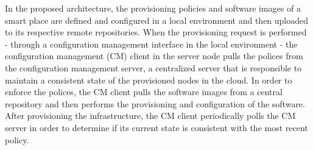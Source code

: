 In the proposed architecture, the provisioning policies and software images of a smart place are
defined and configured in a local environment and then uploaded to its respective remote repositories.
When the provisioning request is performed - through a configuration management interface in the local
environment - the configuration management (CM) client in the server node pulls the polices from the
configuration management server, a centralized server that is responsible to maintain a consistent
state of the provisioned nodes in the cloud. In order to enforce the polices, the CM client pulls the
software images from a central repository and then performs the provisioning and configuration of
the software. After provisioning the infrastructure, the CM client periodically polls the CM server
in order to determine if its current state is consistent with the most recent policy.
